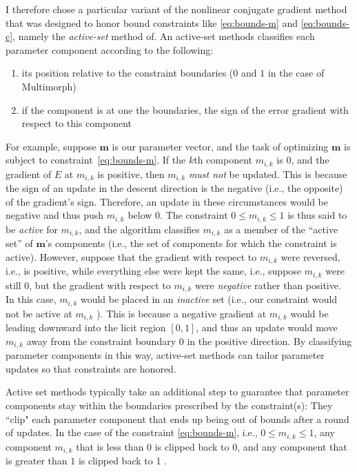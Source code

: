 I therefore chose a particular variant of the nonlinear conjugate gradient method that was designed to honor bound constraints like \eqref{eq:bounds-m} and \eqref{eq:bounds-c}, namely the \emph{active-set} method of\citet{cheng-and-li:2012}. 
An active-set methods classifies
each parameter component according to the following:
\begin{enumerate}
\item its position relative to the constraint boundaries ($0$ and $1$ in the case of Multimorph)
\item if the component is at one the boundaries, the sign of the error gradient with respect to this component
\end{enumerate}
For example, suppose $\textbf{m}$ is our parameter vector, and the task of optimizing $\textbf{m}$ is
subject to constraint~\ref{eq:bounds-m}. If the $k$th component $m_{i,k}$ is $0$, and the gradient of $E$ 
at $m_{i,k}$ is positive, then $m_{i,k}$ \emph{must not} be updated. This is
because the sign of an update in the descent direction is the negative (i.e., the opposite) of the gradient's sign. Therefore,
an update in these circumstances would be negative and thus push $m_{i,k}$ below $0$.
The constraint $0 \leq m_{i,k }\leq 1$ is thus said to be
\emph{active} 
for $m_{i,k}$, and the algorithm classifies $m_{i,k}$ as a member of the ``active set'' of 
$\textbf{m}$'s components (i.e., the set of components for which the constraint is active).
However, suppose that the gradient with respect to $m_{i,k}$ were reversed, i.e., is positive, while everything else were kept the same, i.e., suppose 
$m_{i,k}$ were still $0$, but the gradient with respect to $m_{i,k}$ were \emph{negative} 
rather than positive. 
In this case, $m_{i,k}$ would be placed in an \emph{inactive} set (i.e., our constraint 
would not be active at $m_{i,k}$ ). This is because a negative
gradient at $m_{i,k}$ would be leading downward into the licit region $[0,1]$, and 
thus an update would move $m_{i,k}$ away from the constraint boundary $0$ in the 
positive direction. 
By classifying 
parameter components in this way, active-set methods can tailor parameter updates 
so that constraints are honored. 

Active set methods typically take an 
additional step to guarantee that parameter components stay within the boundaries 
prescribed by the constraint(s): They ``clip" each parameter component that ends up being out 
of bounds after a round of updates. In the case of the constraint \eqref{eq:bounds-m}, i.e., $0 \leq m_{i,k} \leq 1$,
any component $m_{i,k}$ that is less than $0$ is clipped back to $0$, and any component that is greater 
than $1$ is clipped back to 1 \citep{ni:yuan:1997}.

